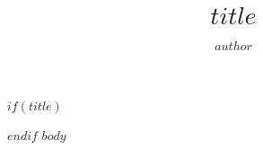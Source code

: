 \documentclass[ngerman,
               parskip=half]{scrartcl}
\title{$title$}
\author{$author$}
\begin{document}
$if(title)$
\maketitle
$endif$
$body$
\end{document}
